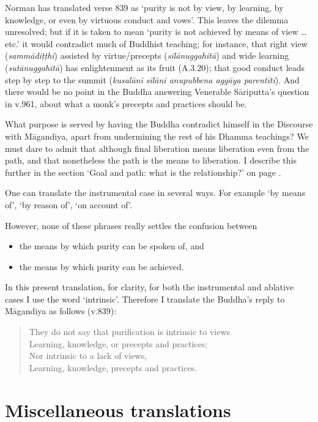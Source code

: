 Norman has translated verse 839 as `purity is not by view, by learning, by knowledge, or even by virtuous conduct and vows'. This leaves the dilemma unresolved; but if it is taken to mean `purity is not achieved by means of view \ldots{} etc.' it would contradict much of Buddhist teaching; for instance, that right view (\textit{sammādiṭṭhi}) assisted by virtue/precepts (\textit{sīlānuggahitā}) and wide learning (\textit{sutānuggahitā}) has enlightenment as its fruit (A.3.20); that good conduct leads step by step to the summit (\textit{kusalāni sīlāni anupubbena aggāya parentīti}). And there would be no point in the Buddha answering Venerable Sāriputta's question in v.961, about what a monk's precepts and practices should be.

What purpose is served by having the Buddha contradict himself in the Discourse with Māgandiya, apart from undermining the rest of his Dhamma teachings? We must dare to admit that although final liberation means liberation even from the path, and that nonetheless the path is the means to liberation. I describe this further in the section `Goal and path: what is the relationship?' on page \pageref{goal-and-the-path}.

One can translate the instrumental case in several ways. For example `by means of', `by reason of', `on account of'.

However, none of these phrases really settles the confusion between

\begin{itemize}
\item the means by which purity can be spoken of, and
\item the means by which purity can be achieved.
\end{itemize}

In this present translation, for clarity, for both the instrumental and ablative cases I use the word `intrinsic'. Therefore I translate the Buddha's reply to Māgandiya as follows (v.839):

\begin{verse}
They do not say that purification is intrinsic to views\\
Learning, knowledge, or precepts and practices;\\
Nor intrinsic to a lack of views,\\
Learning, knowledge, precepts and practices.
\end{verse}

\section*{Miscellaneous translations}

